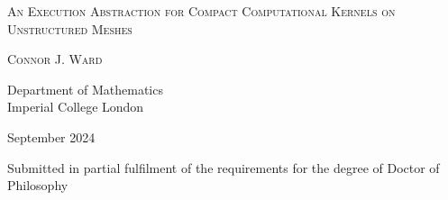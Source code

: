 \begin{titlepage}
  \begin{center}
    \vspace*{1cm}

    \LARGE
    \textsc{An Execution Abstraction for Compact Computational Kernels on Unstructured Meshes}

    \vspace{1.5cm}

    \Large
    \textsc{Connor J. Ward}

    \vspace{5cm}

    \large

    Department of Mathematics \\
    Imperial College London

    \vspace{1cm}

    September 2024

    \vfill

    \begin{minipage}{.75\textwidth}
      \centering
      Submitted in partial fulfilment of the requirements for the degree of Doctor of Philosophy
    \end{minipage}

    \vspace{0.8cm}
  \end{center}
\end{titlepage}
